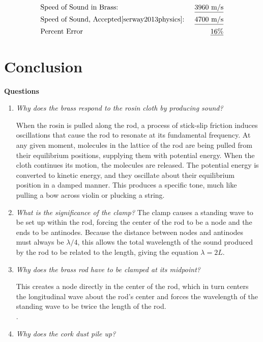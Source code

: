 \documentclass[twocolumn,english]{IEEEtran}
\theoremstyle{plain}
\theoremstyle{plain}
\begin{document}
\noindent\hrulefill
\begin{align*}
 &\text{Speed of Sound in Brass:}				&\text{\underline{$3960$ m/s}} \\
 &\text{Speed of Sound, Accepted\cite{serway2013physics}: }	&\text{\underline{$4700$ m/s}} \\ %
 &\text{Percent Error}						&\text{\underline{$16\%$}}
\end{align*}
\noindent\hrulefill

\section{Conclusion}
\textbf{Questions}
\begin{enumerate}
 \item \textit{Why does the brass respond to the rosin cloth by producing sound?}

  When the rosin is pulled along the rod, a process of stick-slip friction induces oscillations that cause the rod to resonate at its fundamental frequency. At any given moment, molecules in the lattice of the rod are being pulled from their equilibrium positions, supplying them with potential energy. When the cloth continues its motion, the molecules are released. The potential energy is converted to kinetic energy, and they oscillate about their equilibrium position in a damped manner. This produces a specific tone, much like pulling a bow across violin or plucking a string.\\

 \item \textit{What is the significance of the clamp?}
  The clamp causes a standing wave to be set up within the rod, forcing the center of the rod to be a node and the ends to be antinodes. Because the distance between nodes and antinodes must always be $\lambda/4$, this allows the total wavelength of the sound produced by the rod to be related to the length, giving the equation $\lambda = 2L$. \\

 \item \textit{Why does the brass rod have to be clamped at its midpoint?}

  This creates a node directly in the center of the rod, which in turn centers the longitudinal wave about the rod's center and forces the wavelength of the standing wave to be twice the length of the rod.\\
  .
 \item \textit{Why does the cork dust pile up?}


\end{enumerate}
\end{document}

